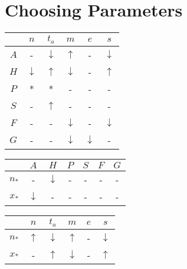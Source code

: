 \documentclass[twocolumn]{article}
\begin{document}
\section{Choosing Parameters}\label{sec:params}

\begin{table}
\begin{tabular}{c|c|c|c|c|c}
        &   $n$             &   $t_a$           &   $m$             &   $e$             &   $s$             \\
    \hline
    $A$ &   -               &   $\downarrow$    &   $\uparrow$      &   -               &   $\downarrow$    \\
    $H$ &   $\downarrow$    &   $\uparrow$      &   $\downarrow$    &   -               &   $\uparrow$      \\
    $P$ &   *               &   *               &   -               &   -               &   -               \\
    $S$ &   -               &   $\uparrow$      &   -               &   -               &   -               \\
    $F$ &   -               &   -               &   $\downarrow$    &   -               &   $\downarrow$    \\
    $G$ &   -               &   -               &   $\downarrow$    &   $\downarrow$    &   -
\end{tabular}
\end{table}

\begin{table}
\begin{tabular}{c|c|c|c|c|c|c}
            &   $A$             &   $H$             &   $P$ &   $S$ &   $F$ &   $G$ \\
    \hline
    $n_*$   &   -               &   $\downarrow$    &   -   &   -   &   -   &   -   \\
    $x_*$   &   $\downarrow$    &   -               &   -   &   -   &   -   &   -   
\end{tabular}
\end{table}

\begin{table}
\begin{tabular}{c|c|c|c|c|c}
            &   $n$             &   $t_a$           &   $m$             &   $e$             &   $s$             \\
    \hline
    $n_*$   &   $\uparrow$      &   $\downarrow$    &   $\uparrow$      &   -               &   $\downarrow$    \\
    $x_*$   &   -               &   $\uparrow$      &   $\downarrow$    &   -               &   $\uparrow$      \\
\end{tabular}
\end{table}
\end{document}
